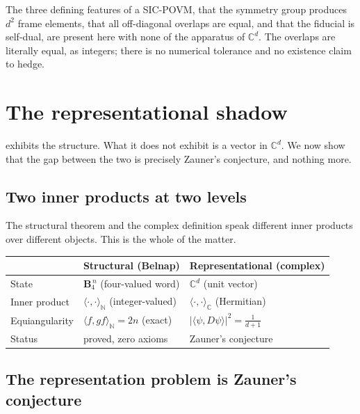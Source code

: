 \documentclass[12pt,a4paper]{article}
\newcommand{\BFour}{\mathbf{B}_4}
\begin{document}
The three defining features of a SIC-POVM, that the symmetry group produces
$d^2$ frame elements, that all off-diagonal overlaps are equal, and that the
fiducial is self-dual, are present here with none of the apparatus of
$\mathbb{C}^d$. The overlaps are literally equal, as integers; there is no
numerical tolerance and no existence claim to hedge.

\section{The representational shadow}
\label{sec:shadow}

 exhibits the structure. What it does not exhibit is a
vector in $\mathbb{C}^d$. We now show that the gap between the two is precisely
Zauner's conjecture, and nothing more.

\subsection{Two inner products at two levels}

The structural theorem and the complex definition speak different inner
products over different objects. This is the whole of the matter.

\begin{center}
\begin{tabularx}{\linewidth}{@{}l X X@{}}
\toprule
 & \textbf{Structural (Belnap)} & \textbf{Representational (complex)} \\
\midrule
State       & $\BFour^{\,n}$ (four-valued word) & $\mathbb{C}^d$ (unit vector) \\
Inner product & $\langle\cdot,\cdot\rangle_{\mathbb{N}}$ (integer-valued) & $\langle\cdot,\cdot\rangle_{\mathbb{C}}$ (Hermitian) \\
Equiangularity & $\langle f, g f\rangle_{\mathbb{N}} = 2n$ (exact) & $|\langle\psi, D\psi\rangle|^2 = \tfrac{1}{d+1}$ \\
Status & proved, zero axioms & Zauner's conjecture \\
\bottomrule
\end{tabularx}
\end{center}

\subsection{The representation problem is Zauner's conjecture}
\end{document}
